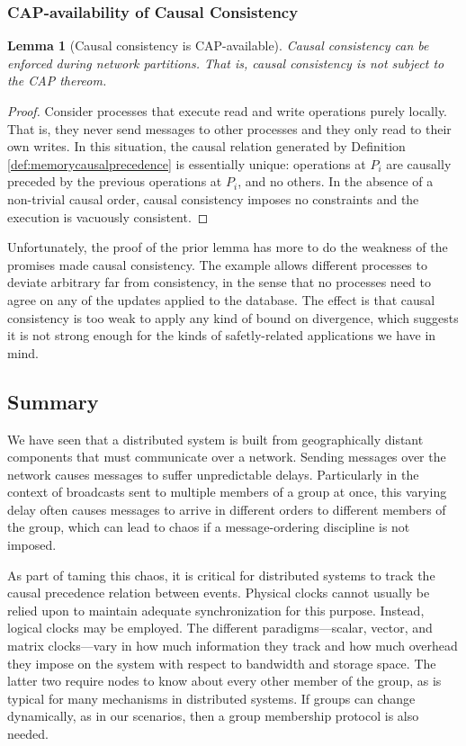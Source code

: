 \documentclass[]             %
{NASA}                       %
\newtheorem{lemma}[theorem]{Lemma}
\theoremstyle{definition}
\begin{document}
\subsubsection{CAP-availability of Causal Consistency}
\label{the-cap-theorem}

\begin{lemma}[Causal consistency is CAP-available]
  \label{thm:cap-causal}
  Causal consistency can be enforced during network partitions. That
  is, causal consistency is not subject to the CAP thereom.
\end{lemma}
\begin{proof}
  Consider processes that execute read and write operations purely
  locally. That is, they never send messages to other processes and
  they only read to their own writes. In this situation, the causal
  relation generated by Definition \ref{def:memorycausalprecedence} is
  essentially unique: operations at $P_i$ are causally preceded by the
  previous operations at $P_i$, and no others. In the absence of a
  non-trivial causal order, causal consistency imposes no constraints
  and the execution is vacuously consistent.
\end{proof}

Unfortunately, the proof of the prior lemma has more to do the
weakness of the promises made causal consistency. The example allows
different processes to deviate arbitrary far from consistency, in the
sense that no processes need to agree on any of the updates applied to
the database. The effect is that causal consistency is too weak to
apply any kind of bound on divergence, which suggests it is not strong
enough for the kinds of safetly-related applications we have in mind.

\subsection{Summary}
\label{sec:background-summary}

We have seen that a distributed system is built from geographically
distant components that must communicate over a network. Sending
messages over the network causes messages to suffer unpredictable
delays. Particularly in the context of broadcasts sent to multiple
members of a group at once, this varying delay often causes messages
to arrive in different orders to different members of the group, which
can lead to chaos if a message-ordering discipline is not imposed.

As part of taming this chaos, it is critical for distributed systems
to track the causal precedence relation between events. Physical
clocks cannot usually be relied upon to maintain adequate
synchronization for this purpose. Instead, logical clocks may be
employed. The different paradigms---scalar, vector, and matrix
clocks---vary in how much information they track and how much overhead
they impose on the system with respect to bandwidth and storage
space. The latter two require nodes to know about every other member
of the group, as is typical for many mechanisms in distributed
systems. If groups can change dynamically, as in our scenarios, then a
group membership protocol is also needed.
\end{document}

